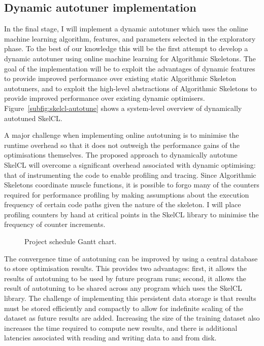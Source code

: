 \subsection{Dynamic autotuner implementation}
In the final stage, I will implement a dynamic autotuner which uses
the online machine learning algorithm, features, and parameters
selected in the exploratory phase. To the best of our knowledge this
will be the first attempt to develop a dynamic autotuner using online
machine learning for Algorithmic Skeletons. The goal of the
implementation will be to exploit the advantages of dynamic features
to provide improved performance over existing static Algorithmic
Skeleton autotuners, and to exploit the high-level abstractions of
Algorithmic Skeletons to provide improved performance over existing
dynamic optimisers. Figure~\ref{subfig:skelcl-autotune} shows a
system-level overview of dynamically autotuned SkelCL.

A major challenge when implementing online autotuning is to minimise
the runtime overhead so that it does not outweigh the performance
gains of the optimisations themselves. The proposed approach to
dynamically autotune SkelCL will overcome a significant overhead
associated with dynamic optimising: that of instrumenting the code to
enable profiling and tracing. Since Algorithmic Skeletons coordinate
muscle functions, it is possible to forgo many of the counters
required for performance profiling by making assumptions about the
execution frequency of certain code paths given the nature of the
skeleton. I will place profiling counters by hand at critical points
in the SkelCL library to minimise the frequency of counter increments.

\begin{figure*}[t!]
\makebox[\textwidth][c]{}
\caption{Project schedule Gantt chart.}
\label{fig:gantt}
\end{figure*}

The convergence time of autotuning can be improved by using a central
database to store optimisation results. This provides two advantages:
first, it allows the results of autotuning to be used by future
program runs; second, it allows the result of autotuning to be shared
across any program which uses the SkelCL library. The challenge of
implementing this persistent data storage is that results must be
stored efficiently and compactly to allow for indefinite scaling of
the dataset as future results are added. Increasing the size of the
training dataset also increases the time required to compute new
results, and there is additional latencies associated with reading and
writing data to and from disk.
